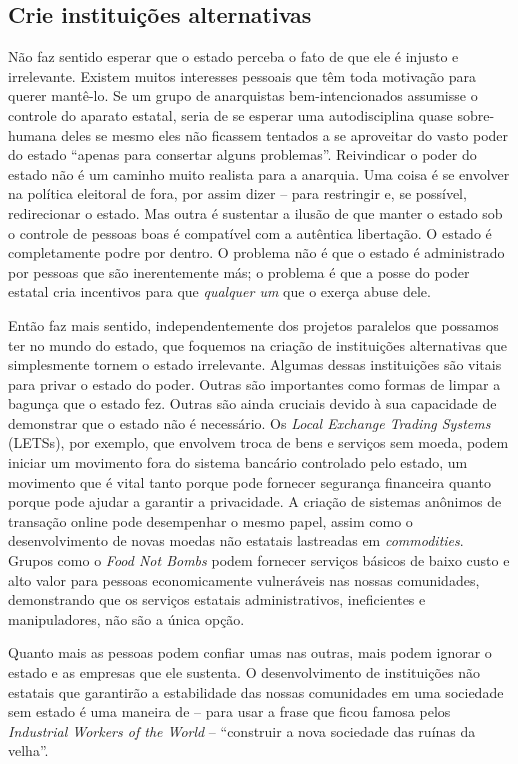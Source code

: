 \subsection*{Crie instituições alternativas}

Não faz sentido esperar que o estado perceba o fato de que ele é injusto e irrelevante. Existem muitos interesses pessoais que têm toda motivação para querer mantê-lo. Se um grupo de anarquistas bem-intencionados assumisse o controle do aparato estatal, seria de se esperar uma autodisciplina quase sobre-humana deles se mesmo eles não ficassem tentados a se aproveitar do vasto poder do estado ``apenas para consertar alguns problemas''. Reivindicar o poder do estado não é um caminho muito realista para a anarquia. Uma coisa é se envolver na política eleitoral de fora, por assim dizer -- para restringir e, se possível, redirecionar o estado. Mas outra é sustentar a ilusão de que manter o estado sob o controle de pessoas boas é compatível com a autêntica libertação. O estado é completamente podre por dentro. O problema não é que o estado é administrado por pessoas que são inerentemente más; o problema é que a posse do poder estatal cria incentivos para que \emph{qualquer um} que o exerça abuse dele.

Então faz mais sentido, independentemente dos projetos paralelos que possamos ter no mundo do estado, que foquemos na criação de instituições alternativas que simplesmente tornem o estado irrelevante. Algumas dessas instituições são vitais para privar o estado do poder. Outras são importantes como formas de limpar a bagunça que o estado fez. Outras são ainda cruciais devido à sua capacidade de demonstrar que o estado não é necessário. Os \emph{Local Exchange Trading Systems} (LETSs), por exemplo, que envolvem troca de bens e serviços sem moeda, podem iniciar um movimento fora do sistema bancário controlado pelo estado, um movimento que é vital tanto porque pode fornecer segurança financeira quanto porque pode ajudar a garantir a privacidade. A criação de sistemas anônimos de transação online pode desempenhar o mesmo papel, assim como o desenvolvimento de novas moedas não estatais lastreadas em \emph{commodities}. Grupos como o \emph{Food Not Bombs} podem fornecer serviços básicos de baixo custo e alto valor para pessoas economicamente vulneráveis nas nossas comunidades, demonstrando que os serviços estatais administrativos, ineficientes e manipuladores, não são a única opção.

Quanto mais as pessoas podem confiar umas nas outras, mais podem ignorar o estado e as empresas que ele sustenta. O desenvolvimento de instituições não estatais que garantirão a estabilidade das nossas comunidades em uma sociedade sem estado é uma maneira de -- para usar a frase que ficou famosa pelos \emph{Industrial Workers of the World} -- ``construir a nova sociedade das ruínas da velha''.

